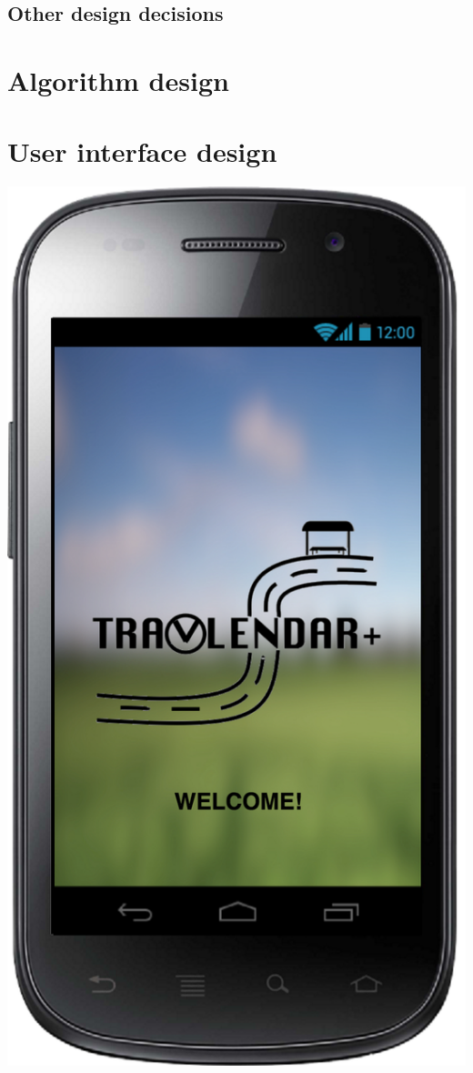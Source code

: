 \documentclass[a4paper,leqno]{article}
\begin{document}
\subsection{Other design decisions}

\newpage
\section{Algorithm design}

\newpage
\section{User interface design}
\begin{minipage}[!t]{.5\linewidth}
      \begin{center}
	  \includegraphics[scale=0.15]{startPage.png}
      \end{center}
\end{minipage}
\end{document}

